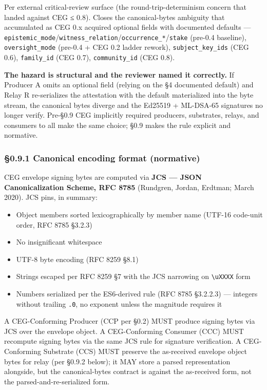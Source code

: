 \documentclass[10pt]{article}
\begin{document}
Per external critical-review surface (the round-trip-determinism concern that landed against CEG ≤ 0.8). Closes the canonical-bytes ambiguity that accumulated as CEG 0.x acquired optional fields with documented defaults — \texttt{epistemic\_mode}/\texttt{witness\_relation}/\texttt{occurrence\_*}/\texttt{stake} (pre-0.4 baseline), \texttt{oversight\_mode} (pre-0.4 + CEG 0.2 ladder rework), \texttt{subject\_key\_ids} (CEG 0.6), \texttt{family\_id} (CEG 0.7), \texttt{community\_id} (CEG 0.8).


\textbf{The hazard is structural and the reviewer named it correctly.} If Producer A omits an optional field (relying on the §4 documented default) and Relay R re-serializes the attestation with the default materialized into the byte stream, the canonical bytes diverge and the Ed25519 + ML-DSA-65 signatures no longer verify. Pre-§0.9 CEG implicitly required producers, substrates, relays, and consumers to all make the same choice; §0.9 makes the rule explicit and normative.


\subsubsection*{§0.9.1 Canonical encoding format (normative)}


CEG envelope signing bytes are computed via \textbf{JCS — JSON Canonicalization Scheme, RFC 8785} (Rundgren, Jordan, Erdtman; March 2020). JCS pins, in summary:


\begin{itemize}\setlength\itemsep{0pt}
\item Object members sorted lexicographically by member name (UTF-16 code-unit order, RFC 8785 §3.2.3)
\item No insignificant whitespace
\item UTF-8 byte encoding (RFC 8259 §8.1)
\item Strings escaped per RFC 8259 §7 with the JCS narrowing on \texttt{\textbackslash{}uXXXX} form
\item Numbers serialized per the ES6-derived rule (RFC 8785 §3.2.2.3) — integers without trailing \texttt{.0}, no exponent unless the magnitude requires it
\end{itemize}


A CEG-Conforming Producer (CCP per §0.2) MUST produce signing bytes via JCS over the envelope object. A CEG-Conforming Consumer (CCC) MUST recompute signing bytes via the same JCS rule for signature verification. A CEG-Conforming Substrate (CCS) MUST preserve the as-received envelope object bytes for relay (per §0.9.2 below); it MAY store a parsed representation alongside, but the canonical-bytes contract is against the as-received form, not the parsed-and-re-serialized form.
\end{document}
